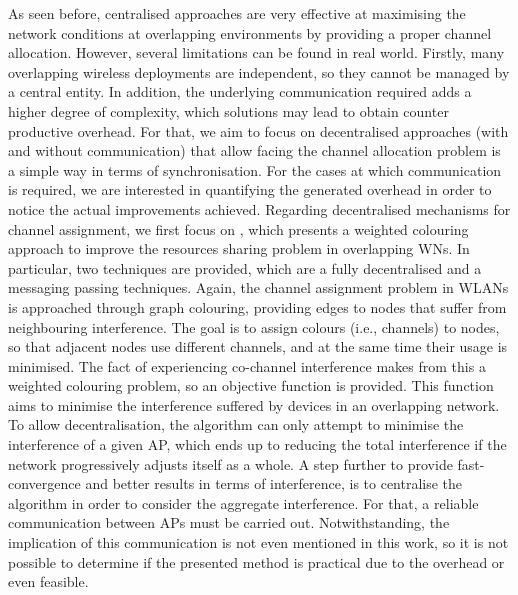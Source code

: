 \documentclass[12pt, a4paper,twoside]{tesi_upf}
\begin{document}
			As seen before, centralised approaches are very effective at maximising the network conditions at overlapping environments by providing a proper channel allocation. However, several limitations can be found in real world. Firstly, many overlapping wireless deployments are independent, so they cannot be managed by a central entity. In addition, the underlying communication required adds a higher degree of complexity, which solutions may lead to obtain counter productive overhead. For that, we aim to focus on decentralised approaches (with and without communication) that allow facing the channel allocation problem is a simple way in terms of synchronisation. For the cases at which communication is required, we are interested in quantifying the generated overhead in order to notice the actual improvements achieved. Regarding decentralised mechanisms for channel assignment, we first focus on \cite{mishra2005weighted}, which presents a weighted colouring approach to improve the resources sharing problem in overlapping WNs. In particular, two techniques are provided, which are a fully decentralised and a messaging passing techniques. Again, the channel assignment problem in WLANs is approached through graph colouring, providing edges to nodes that suffer from neighbouring interference. The goal is to assign colours (i.e., channels) to nodes, so that adjacent nodes use different channels, and at the same time their usage is minimised. The fact of experiencing co-channel interference makes from this a weighted colouring problem, so an objective function is provided. This function aims to minimise the interference suffered by devices in an overlapping network. To allow decentralisation, the algorithm can only attempt to minimise the interference of a given AP, which ends up to reducing the total interference if the network progressively adjusts itself as a whole. A step further to provide fast-convergence and better results in terms of interference, is to centralise the algorithm in order to consider the aggregate interference. For that, a reliable communication between APs must be carried out. Notwithstanding, the implication of this communication is not even mentioned in this work, so it is not possible to determine if the presented method is practical due to the overhead or even feasible.
			
\end{document}
